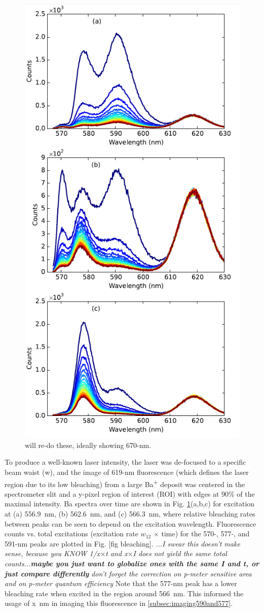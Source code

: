 \begin{figure} %
        \centering
                \includegraphics[width=.5\textwidth]{figures/bleach_spec.png}
                \caption{\color{red}will re-do these, ideally showing 670-nm. \cite{Mong2015}}
\label{fig:specBleach}
\end{figure}

To produce a well-known laser intensity, the laser was de-focused to a specific beam waist (w), and the image of 619-nm fluorescence (which defines the laser region due to its low bleaching) from a large Ba\textsuperscript{+} deposit was centered in the spectrometer slit and a y-pixel region of interest (ROI) with edges at 90\% of the maximal intensity.  Ba spectra over time are shown in Fig. \ref{fig:specBleach}(a,b,c) for excitation at (a) 556.9~nm, (b) 562.6~nm, and (c) 566.3~nm, where relative bleaching rates between peaks can be seen to depend on the excitation wavelength.  Fluorescence counts vs. total excitations (excitation rate $w_{12}$ $\times$ time) for the 570-, 577-, and 591-nm peaks are plotted in Fig. [fig bleaching].  \emph{\color{gray}...I swear this doesn't make sense, because you KNOW 1/x$\times$t and x$\times$I does not yield the same total counts...\textbf{maybe you just want to globalize ones with the same I and t, or just compare differently}} \emph{\color{red}don't forget the correction on p-meter sensitive area and on p-meter quantum efficiency}  Note that the 577-nm peak has a lower bleaching rate when excited in the region around {\color{red}566}~nm.  This informed the usage of {\color{red}x}~nm in imaging this fluorescence in \ref{subsec:imaging590and577}.

